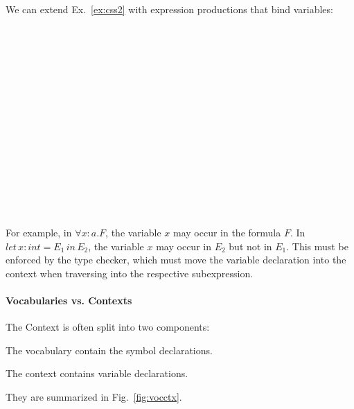 \begin{example}\label{ex:css3}
We can extend Ex.~\ref{ex:css2} with expression productions that bind variables:
\begin{commgrammar}
\\
\\
\\
\\
\\
\\
\\
\\
\\
\\
\\
\\
\\
\\
\end{commgrammar}

For example, in $\forall x:a.F$, the variable $x$ may occur in the formula $F$.
In $let\,x:int=E_1\,in\,E_2$, the variable $x$ may occur in $E_2$ but not in $E_1$.
This must be enforced by the type checker, which must move the variable declaration into the context when traversing into the respective subexpression.
\end{example}


\paragraph{Vocabularies vs. Contexts}
The Context is often split into two components:
\begin{compactitem}
\item The vocabulary contain the symbol declarations.
\item The context contains variable declarations.
\end{compactitem}
They are summarized in Fig.~\ref{fig:vocctx}.

